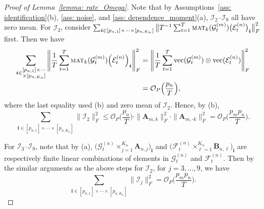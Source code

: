 \documentclass[aos]{imsart}
\theoremstyle{plain}
\theoremstyle{definition}
\def\mat{\textnormal{\textsc{mat}}}
\def\cE{\mathcal{E}}
\def\cF{\mathcal{F}}
\def\cG{\mathcal{G}} \def\cH{\boldsymbol{\mathcal{H}}} \def\cI{\mathcal{I}}
\def\cO{\mathcal{O}}
\def\bi{\boldsymbol{i}}
\def\bA{\mathbf{A}}
\def\bB{\mathbf{B}}
\def\vec{\mathrm{vec}}
\begin{document}
\begin{proof}[Proof of Lemma~\ref{lemma: rate_Omega}]
Note that by Assumptions~\ref{ass: identification}(b), \ref{ass: noise}, and \ref{ass: dependence_moment}(a), $\cI_2$--$\cI_9$ all have zero mean. For $\cI_2$, consider $\sum_{\bi \in [p_{n,1}] \times \cdots \times[p_{n,K_n}]} \big\| T^{-1} \sum_{t=1}^T \mat_k(\cG_t^{(m)}) \big( \cE_t^{(n)} \big)_{\bi} \big\|_F^2$ first. Then we have
\begin{align*}
    \sum_{\bi \in \substack{[p_{n,1}] \times \cdots\\ \times[p_{n,K_n}] }} \Bigg\| \frac{1}{T} \sum_{t=1}^T \mat_k(\cG_t^{(m)}) \Big( \cE_t^{(n)} \Big)_{\bi} \Bigg\|_F^2 
    &= \Bigg\| \frac{1}{T} \sum_{t=1}^T \vec(\cG_t^{(m)}) \otimes \vec(\cE_t^{(n)}) \Bigg\|_F^2 \\
    &= \cO_P\Big( \frac{p_n}{T} \Big) ,
\end{align*}
where the last equality used (b) and zero mean of $\cI_2$. Hence, by (b),
\begin{equation}
\label{eqn: cI2_rate}
\sum_{\bi \in [p_{n,1}] \times \cdots \times[p_{n,K_n}]} \|\cI_2\|_F^2 \leq \cO_P\Big( \frac{p_n}{T} \Big)\cdot \|\bA_{m,k}\|_F^2 \cdot \|\bA_{m,\text{-}k}\|_F^2 = \cO_P\Big( \frac{p_m p_n}{T} \Big) .
\end{equation}

For $\cI_3$--$\cI_9$, note that by (a), $\Big( \cG_t^{(n)} \times_{j=1}^{K_n} \bA_{n,j} \Big)_{\bi}$ and $\Big( \cF_t^{(n)} \times_{\ell=1}^{K_n} \bB_{n,\ell} \Big)_{\bi}$ are respectively finite linear combinations of elements in $\cG_t^{(n)}$ and $\cF_t^{(n)}$. Then by the similar arguments as the above steps for $\cI_2$, for $j=3, \dots, 9$, we have
\begin{equation}
\label{eqn: cI3_to_cI9_rate}
\sum_{\bi \in [p_{n,1}] \times \cdots \times[p_{n,K_n}]} \|\cI_j\|_F^2 = \cO_P\Big( \frac{p_m p_n}{T} \Big) .
\end{equation}



\end{proof}
\end{document}
